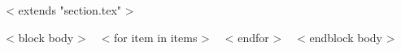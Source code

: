 ~< extends "section.tex" >~

~< block body >~
  ~< for item in items >~
  ~< endfor >~
~< endblock body >~


